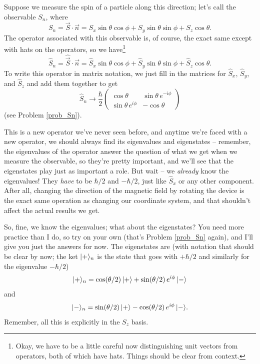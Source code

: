 Suppose we measure the spin of a particle along this direction; let's call the observable $S_n$, where
\begin{equation}
S_n = \vec{S} \cdot \vec{n} = S_x \sin \theta \cos \phi  + S_y \sin \theta \sin \phi + S_z \cos \theta.
\end{equation}
The operator associated with this observable is, of course, the exact same except with hats on the operators, so we have\footnote{Okay, we have to be a little careful now distinguishing unit vectors from operators, both of which have hats.  Things should be clear from context.}
\begin{equation}
\label{eq_Sn}
\hat{S}_n = \hat{\vec{S}} \cdot \vec{n} = \hat{S}_x \sin \theta \cos \phi  + \hat{S}_y \sin \theta \sin \phi  + \hat{S}_z \cos \theta.
\end{equation}
To write this operator in matrix notation, we just fill in the matrices for $\hat{S}_x$, $\hat{S}_y$, and $\hat{S}_z$ and add them together to get
\begin{equation}
\label{eq_Sn_matrix}
\hat{S}_n \to \frac{\hbar}{2} \begin{pmatrix} \cos \theta & \sin \theta \, e^{-i\phi} \\ \sin \theta \, e^{i\phi} & -\cos \theta \end{pmatrix}
\end{equation}
(see Problem \ref{prob_Sn}).

This is a new operator we've never seen before, and anytime we're faced with a new operator, we should always find its eigenvalues and eigenstates -- remember, the eigenvalues of the operator answer the question of what we get when we measure the observable, so they're pretty important, and we'll see that the eigenstates play just as important a role.  But wait -- we \emph{already} know the eigenvalues!  They \emph{have} to be $\hbar/2$ and $-\hbar/2$, just like $\hat{S}_x$ or any other component.  After all, changing the direction of the magnetic field by rotating the device is the exact same operation as changing our coordinate system, and that shouldn't affect the actual results we get.

So, fine, we know the eigenvalues; what about the eigenstates?  You need more practice than I do, so try on your own (that's Problem \ref{prob_Sn} again), and I'll give you just the answers for now.  The eigenstates are (with notation that should be clear by now; the ket $| + \rangle_n$ is the state that goes with $+\hbar/2$ and similarly for the eigenvalue $-\hbar/2$)
\begin{equation}
\label{eq_plus_n}
| + \rangle_n = \cos (\theta/2) \, | + \rangle + \sin (\theta/2) \, e^{i\phi} \, | - \rangle
\end{equation}
and
\begin{equation}
\label{eq_minus_n}
| - \rangle_n = \sin (\theta/2) \, | + \rangle - \cos (\theta/2) \, e^{i\phi} \, | - \rangle.
\end{equation}
Remember, all this is explicitly in the $S_z$ basis.

